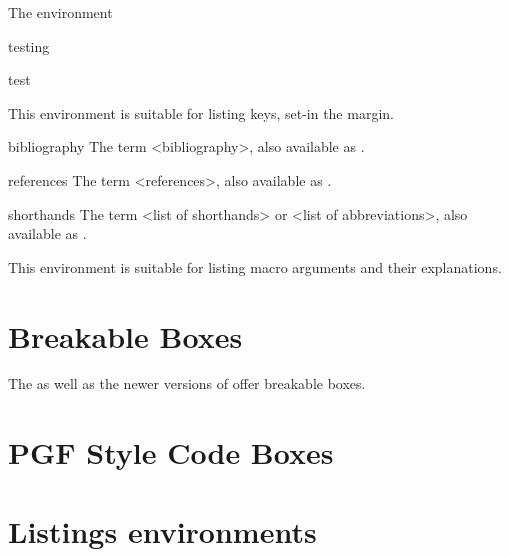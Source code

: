 The environment 
\begin{marglist}
\item[testing]\lorem
\item [test]\lorem
\end{marglist}

This environment is suitable for listing keys, set-in the margin.

\begin{keymarglist}
\item[bibliography] The term <bibliography>, also available as \cmd{\bibname}.
\item[references] The term <references>, also available as .
\item[shorthands] The term <list of shorthands> or <list of abbreviations>, also available as .
\end{keymarglist}


 This environment is suitable for listing macro arguments and their explanations.



\section{Breakable Boxes}

The  as well as the newer versions of 
offer breakable boxes.


\begin{tcolorbox}[enhanced, breakable,
  colback=blue!5!white,colframe=blue!75!black,title=Breakable box,
  watermark color=white,watermark text=\Roman{tcbbreakpart}]
  \lipsum[1-3]
\end{tcolorbox}

\section{PGF Style Code Boxes}

\begin{codeexample}[]
\end{codeexample}


\section{Listings environments}

